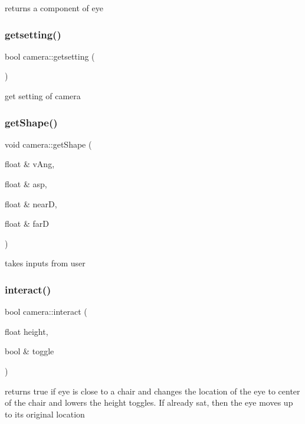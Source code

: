 returns a component of eye \hypertarget{classcamera_a064c75537e4e10added1ef58a702d35d}{}\label{classcamera_a064c75537e4e10added1ef58a702d35d} 
\subsubsection{\texorpdfstring{getsetting()}{getsetting()}}
{\footnotesize\ttfamily bool camera\+::getsetting (\begin{DoxyParamCaption}{ }\end{DoxyParamCaption})}

get setting of camera \hypertarget{classcamera_a3139e23f1084f481d21dda80196f1e7f}{}\label{classcamera_a3139e23f1084f481d21dda80196f1e7f} 
\subsubsection{\texorpdfstring{get\+Shape()}{getShape()}}
{\footnotesize\ttfamily void camera\+::get\+Shape (\begin{DoxyParamCaption}\item[{float \&}]{v\+Ang,  }\item[{float \&}]{asp,  }\item[{float \&}]{nearD,  }\item[{float \&}]{farD }\end{DoxyParamCaption})}

takes inputs from user \hypertarget{classcamera_a5f2c4ec9152aa1a4b5b269e477370d84}{}\label{classcamera_a5f2c4ec9152aa1a4b5b269e477370d84} 
\subsubsection{\texorpdfstring{interact()}{interact()}}
{\footnotesize\ttfamily bool camera\+::interact (\begin{DoxyParamCaption}\item[{float}]{height,  }\item[{bool \&}]{toggle }\end{DoxyParamCaption})}

returns true if eye is close to a chair and changes the location of the eye to center of the chair and lowers the height toggles. If already sat, then the eye moves up to its original location \hypertarget{classcamera_aff5c9f3f12062d6f65a7b8d94b9739da}{}\label{classcamera_aff5c9f3f12062d6f65a7b8d94b9739da} 
